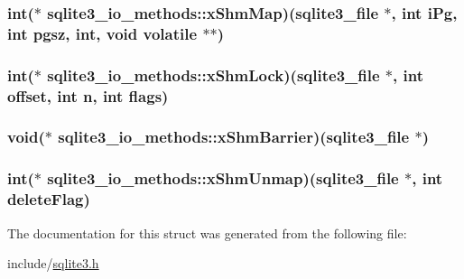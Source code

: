 \hypertarget{structsqlite3__io__methods_42d21006b7f01acb258986f2c090c64d}{
\subsubsection[xShmMap]{\setlength{\rightskip}{0pt plus 5cm}int($\ast$ {\bf sqlite3\_\-io\_\-methods::xShmMap})({\bf sqlite3\_\-file} $\ast$, int iPg, int pgsz, int, void volatile $\ast$$\ast$)}}
\label{structsqlite3__io__methods_42d21006b7f01acb258986f2c090c64d}


\hypertarget{structsqlite3__io__methods_58f4a6b0df86440029cc5fa1b65b1b4e}{
\subsubsection[xShmLock]{\setlength{\rightskip}{0pt plus 5cm}int($\ast$ {\bf sqlite3\_\-io\_\-methods::xShmLock})({\bf sqlite3\_\-file} $\ast$, int offset, int n, int flags)}}
\label{structsqlite3__io__methods_58f4a6b0df86440029cc5fa1b65b1b4e}


\hypertarget{structsqlite3__io__methods_edf4a59fa25ad33e0625a2aa0f6f2184}{
\subsubsection[xShmBarrier]{\setlength{\rightskip}{0pt plus 5cm}void($\ast$ {\bf sqlite3\_\-io\_\-methods::xShmBarrier})({\bf sqlite3\_\-file} $\ast$)}}
\label{structsqlite3__io__methods_edf4a59fa25ad33e0625a2aa0f6f2184}


\hypertarget{structsqlite3__io__methods_f69cbc7ece1854576ac262f986871563}{
\subsubsection[xShmUnmap]{\setlength{\rightskip}{0pt plus 5cm}int($\ast$ {\bf sqlite3\_\-io\_\-methods::xShmUnmap})({\bf sqlite3\_\-file} $\ast$, int deleteFlag)}}
\label{structsqlite3__io__methods_f69cbc7ece1854576ac262f986871563}




The documentation for this struct was generated from the following file:\begin{CompactItemize}
\item 
include/\hyperlink{sqlite3_8h}{sqlite3.h}\end{CompactItemize}
